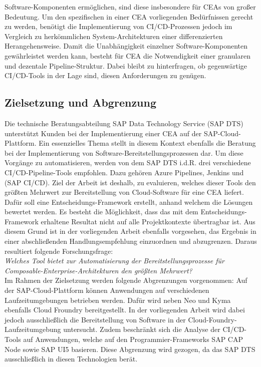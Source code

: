 Software-Komponenten ermöglichen, sind diese insbesondere für CEAs von großer Bedeutung. Um den spezifischen in einer CEA vorliegenden Bedürfnissen gerecht zu werden, benötigt die Implementierung von CI/CD-Prozessen jedoch im Vergleich zu herkömmlichen System-Architekturen einer differenzierten Herangehensweise. Damit die Unabhängigkeit einzelner Software-Komponenten gewährleistet werden kann, besteht für CEA die Notwendigkeit einer granularen und dezentale Pipeline-Struktur. Dabei bleibt zu hinterfragen, ob gegenwärtige CI/CD-Tools in der Lage sind, diesen Anforderungen zu genügen.


\subsection{Zielsetzung und Abgrenzung}
Die technische Beratungsabteilung SAP Data Technology Service (\acs{SAP DTS}) unterstützt Kunden bei der Implementierung einer CEA auf der SAP-Cloud-Plattform. 
Ein essenzielles Thema stellt in diesem Kontext ebenfalls die Beratung bei der Implementierung von Software-Bereitstellungsprozessen dar. Um diese Vorgänge zu automatisieren, werden von dem SAP DTS i.d.R. drei verschiedene CI/CD-Pipeline-Tools empfohlen. Dazu gehören Azure Pipelines, Jenkins und  (\acs{SAP CI/CD}). Ziel der Arbeit ist deshalb, zu evaluieren, welches dieser Tools den größten Mehrwert zur Bereitstellung von Cloud-Software für eine CEA liefert. Dafür soll eine Entscheidungs-Framework erstellt, anhand welchem die Lösungen bewertet werden. Es besteht die Möglichkeit, dass das mit dem Entscheidungs-Framework erhaltene Resultat nicht auf alle Projektkontexte übertragbar ist. Aus diesem Grund ist in der vorliegenden Arbeit ebenfalls vorgesehen, das Ergebnis in einer abschließenden Handlungsempfehlung einzuordnen und abzugrenzen. Daraus resultiert folgende Forschungsfrage:\\
\textit{Welches Tool bietet zur Automatisierung der Bereitstellungsprozesse für Composable-\-Enterprise-Architekturen den größten Mehrwert?}\\
Im Rahmen der Zielsetzung werden folgende Abgrenzungen vorgenommen: Auf der SAP-Cloud-Plattform können Anwendungen auf verschiedenen Laufzeitumgebungen betrieben werden. Dafür wird neben Neo und Kyma ebenfalls Cloud Froundry bereitgestellt. In der vorliegenden Arbeit wird dabei jedoch ausschließlich die Bereitstellung von Software in der Cloud-Foundry-Laufzeitumgebung untersucht. Zudem beschränkt sich die Analyse der CI/CD-Tools auf Anwendungen, welche auf den Programmier-Frameworks SAP CAP Node sowie SAP UI5 basieren. Diese Abgrenzung wird gezogen, da das SAP DTS ausschließlich in diesen Technologien berät.  

